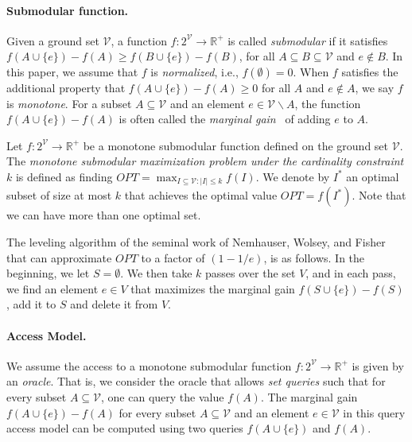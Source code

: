 \documentclass[11pt]{article}
\newcommand{\REAL}{\ensuremath{\mathbb{R}}}
\newcommand{\ground}{\ensuremath{\mathcal{V}}}
\begin{document}
\paragraph{Submodular function.}
Given a ground set $\ground$, a function $f: 2^{\ground} \rightarrow \REAL^+$  is called \emph{submodular}  if it satisfies 
$ f(A \cup \{e\}) -f(A) \ge f(B \cup \{e\}) -f(B)$, for all $A \subseteq B \subseteq \ground$ and $e \notin B$. 
In this paper, we assume that $f$ is \emph{normalized}, i.e., $f(\emptyset) = 0$. 
When $f$ satisfies the additional property that $f(A \cup \{e\}) -f(A) \ge 0$ for all $A$ and $e \notin A$, we say $f$ is \emph{monotone}. 
For a subset  $A \subseteq \ground$ and an element $e \in \ground \backslash A$, the function $ f(A \cup \{e\}) - f(A)$ is often called the \emph{marginal gain}~\cite{DBLP:conf/kdd/BadanidiyuruMKK14,DBLP:conf/icml/0001MZLK19} of 
adding  $e$ to $A$. 


Let $f: 2^{\ground} \rightarrow \REAL^+$ be a monotone submodular function defined on 
the ground set $\ground$.  
The \emph{monotone submodular maximization problem under the cardinality constraint} $k$ 
is defined as finding $OPT = \max_{I \subseteq \ground: |I| \le k} f(I)$. 
We denote by $I^*$ an optimal subset of size at most $k$ that achieves the optimal value $OPT = f(I^*)$. 
Note that we can have more than one optimal set. 

The leveling algorithm of the seminal work of Nemhauser, Wolsey, and Fisher \cite{DBLP:journals/mp/NemhauserWF78} that can approximate $OPT$ to a factor of $(1-1/e)$, is as follows. 
In the beginning, we let $S=\emptyset$. We then take $k$ passes over the set $V$, and in each pass, we 
find an element $e \in V$ that maximizes the marginal gain $f(S \cup \{e\}) - f(S)$, add it to $S$ and delete it from $V$. 

\paragraph{Access Model.}
We assume the access to a monotone submodular function $f: 2^{\ground} \rightarrow \REAL^+$ is given by an \emph{oracle}. 
That is, we consider the oracle that allows \emph{set queries} such that 
for every subset $A \subseteq \ground$, one can query the value $f(A)$. 
The marginal gain $f(A \cup \{e\}) - f(A)$ for every subset  $A \subseteq \ground$ and an element $e \in \ground$ in this query access model can be computed using two queries $f(A \cup \{e\})$ and $f(A)$. 
\end{document}
